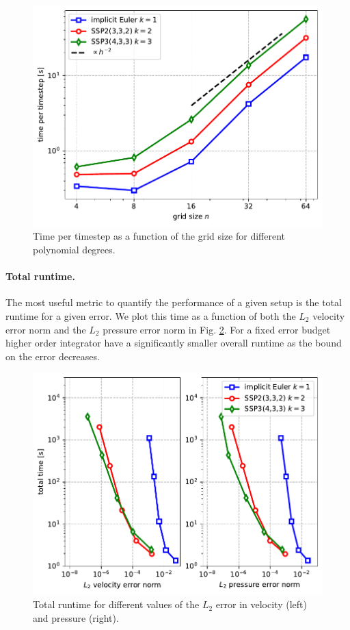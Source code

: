 \documentclass[11pt]{article}
\begin{document}
\begin{figure}
    \begin{center}
        \includegraphics[width=0.75\linewidth]{figures/ttimestep.pdf}
        \caption{Time per timestep as a function of the grid size for different polynomial degrees.}
        \label{fig:titer}
    \end{center}
\end{figure}
\paragraph{Total runtime.}
The most useful metric to quantify the performance of a given setup is the total runtime for a given error. We plot this time as a function of both the $L_2$ velocity error norm and the $L_2$ pressure error norm in Fig. \ref{fig:ttotal}. For a fixed error budget higher order integrator have a significantly smaller overall runtime as the bound on the error decreases.
\begin{figure}
    \begin{center}
        \includegraphics[width=0.75\linewidth]{figures/ttotal.pdf}
        \caption{Total runtime for different values of the $L_2$ error in velocity (left) and pressure (right).}
        \label{fig:ttotal}
    \end{center}
\end{figure}
\clearpage
\appendix
\end{document}
